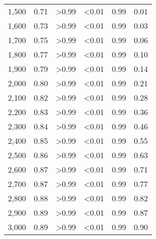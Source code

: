 \documentclass[11pt]{book}
\begin{document}
\begin{longtable}[]{@{}llllll@{}}
1,500 & 0.71 & \textgreater0.99 & \textless0.01 & 0.99 & 0.01\tabularnewline
1,600 & 0.73 & \textgreater0.99 & \textless0.01 & 0.99 & 0.03\tabularnewline
1,700 & 0.75 & \textgreater0.99 & \textless0.01 & 0.99 & 0.06\tabularnewline
1,800 & 0.77 & \textgreater0.99 & \textless0.01 & 0.99 & 0.10\tabularnewline
1,900 & 0.79 & \textgreater0.99 & \textless0.01 & 0.99 & 0.14\tabularnewline
2,000 & 0.80 & \textgreater0.99 & \textless0.01 & 0.99 & 0.21\tabularnewline
2,100 & 0.82 & \textgreater0.99 & \textless0.01 & 0.99 & 0.28\tabularnewline
2,200 & 0.83 & \textgreater0.99 & \textless0.01 & 0.99 & 0.36\tabularnewline
2,300 & 0.84 & \textgreater0.99 & \textless0.01 & 0.99 & 0.46\tabularnewline
2,400 & 0.85 & \textgreater0.99 & \textless0.01 & 0.99 & 0.55\tabularnewline
2,500 & 0.86 & \textgreater0.99 & \textless0.01 & 0.99 & 0.63\tabularnewline
2,600 & 0.87 & \textgreater0.99 & \textless0.01 & 0.99 & 0.71\tabularnewline
2,700 & 0.87 & \textgreater0.99 & \textless0.01 & 0.99 & 0.77\tabularnewline
2,800 & 0.88 & \textgreater0.99 & \textless0.01 & 0.99 & 0.82\tabularnewline
2,900 & 0.89 & \textgreater0.99 & \textless0.01 & 0.99 & 0.87\tabularnewline
3,000 & 0.89 & \textgreater0.99 & \textless0.01 & 0.99 & 0.90\tabularnewline
\bottomrule
\end{longtable}
\clearpage

\clearpage
\end{document}
